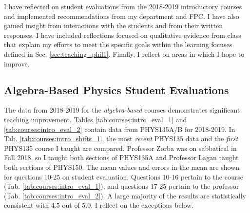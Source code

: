 \documentclass[../../main.tex]{subfiles}
\begin{document}
\label{sec:oof}

I have reflected on student evaluations from the 2018-2019 introductory courses and implemented recommendations from my department and FPC.  I have also gained insight from interactions with the students and from their written responses.  I have included reflections focused on qualitative evidence from class that explain my efforts to meet the specific goals within the learning focuses defined in Sec. \ref{sec:teaching_phil1}.  Finally, I reflect on areas in which I hope to improve.  \\ \hspace{0.1cm}

\subsection{Algebra-Based Physics Student Evaluations}

The data from 2018-2019 for the \textit{algebra-based} courses demonstrates significant teaching improvement.  Tables \ref{tab:courses:intro_eval_1} and \ref{tab:courses:intro_eval_2} contain data from PHYS135A/B for 2018-2019.  In Tab. \ref{tab:courses:intro_shifts_1}, the most \textit{recent} PHYS135 data and the \textit{first} PHYS135 course I taught are compared.  Professor Zorba was on sabbatical in Fall 2018, so I taught both sections of PHYS135A and Professor Lagan taught both sections of PHYS150.  The mean values and errors in the mean are shown for questions 10-25 on student evaluation.  Questions 10-16 pertain to the course (Tab. \ref{tab:courses:intro_eval_1}), and questions 17-25 pertain to the professor (Tab. \ref{tab:courses:intro_eval_2}).  A large majority of the results are statistically consistent with 4.5 out of 5.0.  I reflect on the exceptions below. \\ \hspace{0.1cm}
\end{document}
